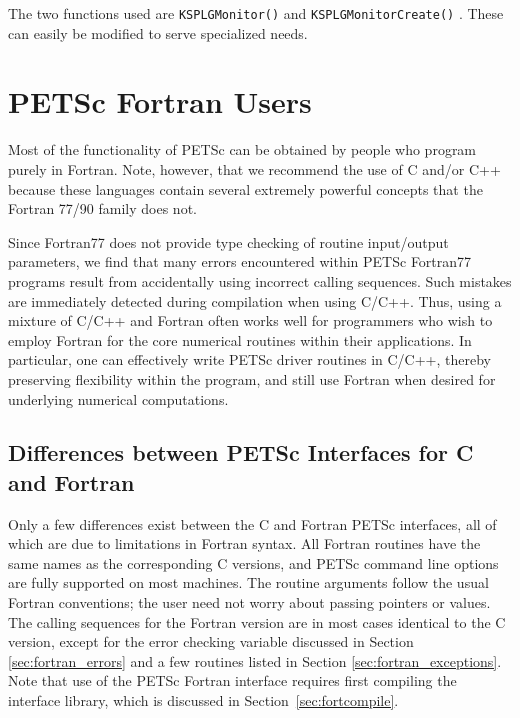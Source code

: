 The two functions used are {\tt KSPLGMonitor()} 
and {\tt KSPLGMonitorCreate()}  . These 
can easily be modified to serve specialized needs.

\chapter{PETSc Fortran Users}
\label{ch:fortran}

Most of the functionality of PETSc can be obtained by people who
program purely in Fortran.  Note, however, that we recommend the
use of C and/or C++ because these languages contain several extremely powerful
concepts that the Fortran 77/90 family does not. 

Since Fortran77 does not provide type checking of routine input/output
parameters, we find that many errors encountered within PETSc Fortran77
programs result from accidentally using incorrect calling sequences.
Such mistakes are immediately detected during compilation when using
C/C++.  Thus, using a mixture of C/C++ and Fortran often works well
for programmers who wish to employ Fortran for the core numerical
routines within their applications.  In particular, one can
effectively write PETSc driver routines in C/C++, thereby preserving
flexibility within the program, and still use Fortran when desired for
underlying numerical computations.

\section{Differences between PETSc Interfaces for C and Fortran}

Only a few differences exist between the C and Fortran PETSc
interfaces, all of which are due to limitations in Fortran syntax.
All Fortran routines have the same names as the corresponding C
versions, and PETSc command line options are fully supported on most 
machines.  The
routine arguments follow the usual Fortran conventions; the user need
not worry about passing pointers or values.  The calling sequences
for the Fortran version are in most cases identical to the C version,
except for the error checking variable discussed in 
Section \ref{sec:fortran_errors} and a few routines listed in 
Section \ref{sec:fortran_exceptions}.
Note that use of the PETSc Fortran interface requires first compiling
the interface library, which is discussed in Section~\ref{sec:fortcompile}.

